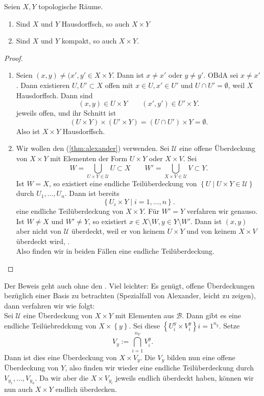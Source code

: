 \begin{theorem}[Produkteigenschaften]\label{thm:produkte-erhalten-hausdorff-und-kompaktheit}
    Seien $X,Y$ topologische Räume.
\begin{enumerate}[1)]
        \item Sind $X$ und  $Y$ Hausdorffsch, so auch  $X\times Y$
        \item Sind $X$ und $Y$ kompakt, so auch  $X\times Y$.
    \end{enumerate}
\end{theorem}
\begin{proof}
    \begin{enumerate}[1)]
        \item Seien $(x,y) \neq  (x',y' \in X\times Y$. Dann ist $x\neq x'$ oder $y\neq y'$. OBdA sei $x\neq x'$. Dann existieren $U,U'\subset X$ offen mit $x\in U, x'\in U'$ und $U\cap U' = \emptyset$, weil $X$ Hausdorffsch. Dann sind
            \[
                (x,y)           \in  U\times Y \qquad (x',y') \in U' \times Y
            .\] 
    jeweils offen, und ihr Schnitt ist
    \[
        (        U\times Y) \times (U'\times Y) = (U\cap U') \times Y = \emptyset
    .\] 
    Also ist $X\times Y$ Hausdorffsch.
\item Wir wollen den  (\ref{thm:alexander}) verwenden. Sei $\mathcal{U}$ eine offene Überdeckung von  $X\times Y$ mit Elementen der Form $U\times Y$ oder $X\times V$. Sei
    \[
    W = \bigcup_{U\times Y \in \mathcal{U}} U \subset X \qquad W' = \bigcup_{X\times V \in \mathcal{U}} V \subset Y  
    .\] 
    Ist $W = X$, so existiert eine endliche Teilüberdeckung von  $\left \{U \mid  U\times Y \in \mathcal{U}\right\} $ durch $U_1,\ldots,U_n$. Dann ist bereits
    \[
    \left \{U_i \times Y \mid  i=1,\ldots,n\right\} 
    .\] 
    eine endliche Teilüberdeckung von $X\times Y$. Für $W' = Y$ verfahren wir genauso. Ist  $W \neq  X$ und $W'\neq Y$, so existiert $x\in X \setminus W, y\in Y \setminus W'$. Dann ist $(x,y)$ aber nicht von  $\mathcal{U}$ überdeckt, weil er von keinem $U\times Y$ und von keinem $X\times V$ überdeckt wird, \contra. \\
    Also finden wir in beiden Fällen eine endliche Teilüberdeckung.
    \end{enumerate}
\end{proof}
\begin{remark}
    Der Beweis geht auch ohne den . Viel leichter: Es genügt, offene Überdeckungen bezüglich einer Basis zu betrachten (Spezialfall von Alexander, leicht zu zeigen), dann verfahren wir wie folgt: \\
    Sei $\mathcal{U}$ eine Überdeckung von $X\times Y$ mit Elementen aus $\mathcal{B}$. Dann gibt es eine endliche Teilüebredckung von $X\times \left \{y\right\} $. Sei diese $\left \{U_i^y \times V_i^y\right\} i=1^{n_y}$. Setze
    \[
        V_y := \bigcap_{i=1} ^{n_Y} V_i^{y}
    .\] 
    Dann ist dies eine Überdeckung von $X\times V_y$. Die $V_y$ bilden nun eine offene Überdeckung von  $Y$, also finden wir wieder eine endliche Teilüberdeckung durch  $V_{y_1}, \ldots, V_{y_n}$. Da wir aber die $X\times V_{y_i}$ jeweils endlich überdeckt haben, können wir nun auch $X\times Y$ endlich überdecken.
\end{remark}
